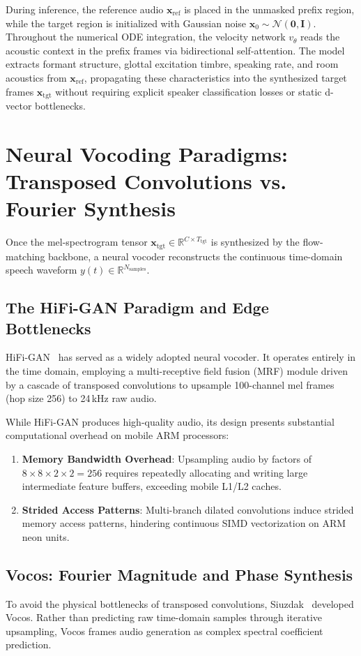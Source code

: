 During inference, the reference audio $\mathbf{x}_{\text{ref}}$ is placed in the unmasked prefix region, while the target region is initialized with Gaussian noise $\mathbf{x}_0 \sim \mathcal{N}(\mathbf{0}, \mathbf{I})$. Throughout the numerical ODE integration, the velocity network $v_\theta$ reads the acoustic context in the prefix frames via bidirectional self-attention. The model extracts formant structure, glottal excitation timbre, speaking rate, and room acoustics from $\mathbf{x}_{\text{ref}}$, propagating these characteristics into the synthesized target frames $\mathbf{x}_{\text{tgt}}$ without requiring explicit speaker classification losses or static d-vector bottlenecks.

\section{Neural Vocoding Paradigms: Transposed Convolutions vs. Fourier Synthesis}
Once the mel-spectrogram tensor $\mathbf{x}_{\text{tgt}} \in \mathbb{R}^{C \times T_{\text{tgt}}}$ is synthesized by the flow-matching backbone, a neural vocoder reconstructs the continuous time-domain speech waveform $y(t) \in \mathbb{R}^{N_{\text{samples}}}$.

\subsection{The HiFi-GAN Paradigm and Edge Bottlenecks}
HiFi-GAN~\cite{kong2020hifigan} has served as a widely adopted neural vocoder. It operates entirely in the time domain, employing a multi-receptive field fusion (MRF) module driven by a cascade of transposed convolutions to upsample 100-channel mel frames (hop size 256) to 24\,kHz raw audio.

While HiFi-GAN produces high-quality audio, its design presents substantial computational overhead on mobile ARM processors:
\begin{enumerate}
    \item \textbf{Memory Bandwidth Overhead}: Upsampling audio by factors of $8 \times 8 \times 2 \times 2 = 256$ requires repeatedly allocating and writing large intermediate feature buffers, exceeding mobile L1/L2 caches.
    \item \textbf{Strided Access Patterns}: Multi-branch dilated convolutions induce strided memory access patterns, hindering continuous SIMD vectorization on ARM \gls{neon} units.
\end{enumerate}

\subsection{Vocos: Fourier Magnitude and Phase Synthesis}
To avoid the physical bottlenecks of transposed convolutions, Siuzdak~\cite{siuzdak2023vocos} developed Vocos. Rather than predicting raw time-domain samples through iterative upsampling, Vocos frames audio generation as complex spectral coefficient prediction.

